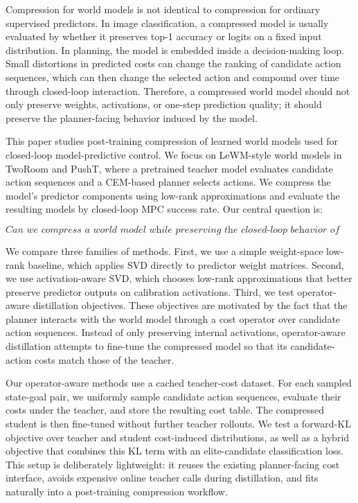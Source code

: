 \documentclass[11pt]{article}
\begin{document}
Compression for world models is not identical to compression for ordinary supervised predictors. In image classification, a compressed model is usually evaluated by whether it preserves top-1 accuracy or logits on a fixed input distribution. In planning, the model is embedded inside a decision-making loop. Small distortions in predicted costs can change the ranking of candidate action sequences, which can then change the selected action and compound over time through closed-loop interaction. Therefore, a compressed world model should not only preserve weights, activations, or one-step prediction quality; it should preserve the planner-facing behavior induced by the model.

This paper studies post-training compression of learned world models used for closed-loop model-predictive control. We focus on LeWM-style world models in TwoRoom and PushT, where a pretrained teacher model evaluates candidate action sequences and a CEM-based planner selects actions. We compress the model's predictor components using low-rank approximations and evaluate the resulting models by closed-loop MPC success rate. Our central question is:

\[
    \textit{Can we compress a world model while preserving the closed-loop behavior of the planner that uses it?}
\]

We compare three families of methods. First, we use a simple weight-space low-rank baseline, which applies SVD directly to predictor weight matrices. Second, we use activation-aware SVD, which chooses low-rank approximations that better preserve predictor outputs on calibration activations. Third, we test operator-aware distillation objectives. These objectives are motivated by the fact that the planner interacts with the world model through a cost operator over candidate action sequences. Instead of only preserving internal activations, operator-aware distillation attempts to fine-tune the compressed model so that its candidate-action costs match those of the teacher.

Our operator-aware methods use a cached teacher-cost dataset. For each sampled state-goal pair, we uniformly sample candidate action sequences, evaluate their costs under the teacher, and store the resulting cost table. The compressed student is then fine-tuned without further teacher rollouts. We test a forward-KL objective over teacher and student cost-induced distributions, as well as a hybrid objective that combines this KL term with an elite-candidate classification loss. This setup is deliberately lightweight: it reuses the existing planner-facing cost interface, avoids expensive online teacher calls during distillation, and fits naturally into a post-training compression workflow.
\end{document}
